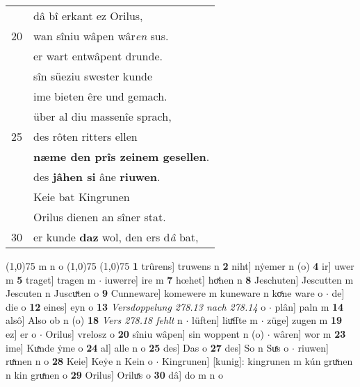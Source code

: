 \documentclass[8pt,a4paper,notitlepage]{article}
\begin{document}
\begin{table}[ht]
\begin{minipage}[t]{0.5\linewidth}
\begin{tabular}{rl}
 & dâ bî erkant ez Orilus,\\ 
20 & wan sîniu wâpen wâr\textit{en} sus.\\ 
 & er wart entwâpent drunde.\\ 
 & sîn süeziu swester kunde\\ 
 & ime bieten êre und gemach.\\ 
 & über al diu massenîe sprach,\\ 
25 & des rôten ritters ellen\\ 
 & \textbf{næme den prîs zeinem gesellen}.\\ 
 & des \textbf{jâhen si} âne \textbf{riuwen}.\\ 
 & Keie bat Kingrunen\\ 
 & Orilus dienen an sîner stat.\\ 
30 & er kunde \textbf{daz} wol, den ers d\textit{â} bat,\\ 
\end{tabular}
\scriptsize
\line(1,0){75} \newline
m n o \newline
\line(1,0){75} \newline
\newline
\line(1,0){75} \newline
\textbf{1} trûrens] truwens n \textbf{2} niht] nẏemer n (o) \textbf{4} ir] uwer m \textbf{5} traget] tragen m  $\cdot$ iuwerre] ire m \textbf{7} hœhet] hoͯhen n \textbf{8} Jeschuten] Jescutten m Jescuten n Juscuͯten o \textbf{9} Cunneware] komewere m kuneware n koͯne ware o  $\cdot$ de] die o \textbf{12} eines] eyn o \textbf{13} \textit{Versdoppelung 278.13 nach 278.14} o   $\cdot$ plân] paln m \textbf{14} alsô] Also ob n (o) \textbf{18} \textit{Vers 278.18 fehlt} n   $\cdot$ lüften] liuͯffte m  $\cdot$ züge] zugen m \textbf{19} ez] er o  $\cdot$ Orilus] vrelosz o \textbf{20} sîniu wâpen] sin woppent n (o)  $\cdot$ wâren] wor m \textbf{23} ime] Kuͯnde ẏme o \textbf{24} al] alle n o \textbf{25} des] Das o \textbf{27} des] So n Suͯs o  $\cdot$ riuwen] ruͯmen n o \textbf{28} Keie] Keẏe n Kein o  $\cdot$ Kingrunen] [kunig]: kingrunen m kún gruͯnen n kin gruͯnen o \textbf{29} Orilus] Oriluͯs o \textbf{30} dâ] do m n o \newline
\end{minipage}
\end{table}
\newpage
\end{document}
